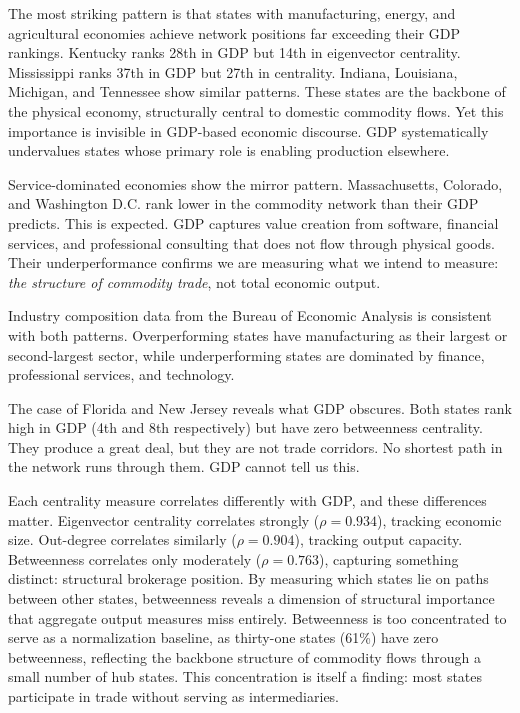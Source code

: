 \documentclass[12pt,oneside]{book}
\begin{document}
The most striking pattern is that states with manufacturing, energy, and agricultural economies achieve network positions far exceeding their GDP rankings. Kentucky ranks 28th in GDP but 14th in eigenvector centrality. Mississippi ranks 37th in GDP but 27th in centrality. Indiana, Louisiana, Michigan, and Tennessee show similar patterns. These states are the backbone of the physical economy, structurally central to domestic commodity flows. Yet this importance is invisible in GDP-based economic discourse. GDP systematically undervalues states whose primary role is enabling production elsewhere.

Service-dominated economies show the mirror pattern. Massachusetts, Colorado, and Washington D.C. rank lower in the commodity network than their GDP predicts. This is expected. GDP captures value creation from software, financial services, and professional consulting that does not flow through physical goods. Their underperformance confirms we are measuring what we intend to measure: \emph{the structure of commodity trade}, not total economic output.

Industry composition data from the Bureau of Economic Analysis \cite{bea_gdp_state_2024} is consistent with both patterns. Overperforming states have manufacturing as their largest or second-largest sector, while underperforming states are dominated by finance, professional services, and technology.

The case of Florida and New Jersey reveals what GDP obscures. Both states rank high in GDP (4th and 8th respectively) but have zero betweenness centrality. They produce a great deal, but they are not trade corridors. No shortest path in the network runs through them. GDP cannot tell us this.

Each centrality measure correlates differently with GDP, and these differences matter. Eigenvector centrality correlates strongly ($\rho = 0.934$), tracking economic size. Out-degree correlates similarly ($\rho = 0.904$), tracking output capacity. Betweenness correlates only moderately ($\rho = 0.763$), capturing something distinct: structural brokerage position. By measuring which states lie on paths between other states, betweenness reveals a dimension of structural importance that aggregate output measures miss entirely. Betweenness is too concentrated to serve as a normalization baseline, as thirty-one states (61\%) have zero betweenness, reflecting the backbone structure of commodity flows through a small number of hub states. This concentration is itself a finding: most states participate in trade without serving as intermediaries. 
\end{document}

